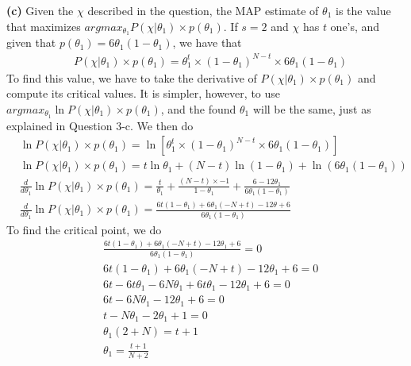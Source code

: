 \documentclass[leqno]{article}
\begin{document}
\noindent \textbf{(c)} Given the $\chi$ described in the question, the MAP estimate of $\theta_1$ is the value that maximizes 
 $argmax_{\theta_1} P(\chi|\theta_1) \times p(\theta_1)$. If $s = 2$ and $\chi$ has $t$ one's, and given that $p(\theta_1) = 6\theta_1(1 - \theta_1)$, 
we have that
\begin{equation*}
\begin{split}
&P(\chi|\theta_1) \times p(\theta_1) = \theta_1^t \times (1 - \theta_1)^{N - t} \times 6\theta_1(1 - \theta_1)
\end{split}  
\end{equation*} 
To find this value, we have to take the derivative of $P(\chi|\theta_1) \times p(\theta_1)$ and compute its critical values. It is simpler, however, 
to use $argmax_{\theta_1} \ln P(\chi|\theta_1) \times p(\theta_1)$, and the found $\theta_1$ will be the same, just as explained in Question 3-c. 
We then do
\begin{equation*}
\begin{split}
&\ln P(\chi|\theta_1) \times p(\theta_1) = \ln[\theta_1^t \times (1 - \theta_1)^{N - t} \times 6\theta_1(1 - \theta_1)]
\\
&\ln P(\chi|\theta_1) \times p(\theta_1) = t\ln \theta_1 + (N - t) \ln (1 - \theta_1) + \ln (6\theta_1(1 - \theta_1))
\\
&\frac{d}{d\theta_1}\ln P(\chi|\theta_1) \times p(\theta_1) = \frac{t}{\theta_1} + \frac{(N - t) \times -1}{1 - \theta_1} + \frac{6 - 12\theta_1}{6\theta_1(1 - \theta_1)}
\\
&\frac{d}{d\theta_1}\ln P(\chi|\theta_1) \times p(\theta_1) = \frac{6t(1 - \theta_1) + 6\theta_1(-N + t) - 12\theta + 6}{6\theta_1(1 - \theta_1)}
\end{split}  
\end{equation*} 
To find the critical point, we do
\begin{equation*}
\begin{split}
&\frac{6t(1 - \theta_1) + 6\theta_1(-N + t) - 12\theta_1 + 6}{6\theta_1(1 - \theta_1)} = 0
\\
& 6t(1 - \theta_1) + 6\theta_1(-N + t) - 12\theta_1 + 6 = 0
\\
& 6t - 6t\theta_1 - 6N\theta_1 + 6t\theta_1 -12\theta_1 + 6 = 0
\\
&6t - 6N\theta_1 -12\theta_1 + 6 = 0
\\
&t - N\theta_1 -2\theta_1 + 1 = 0
\\
&\theta_1(2 + N) = t + 1
\\
&\theta_1 = \frac{t + 1}{N + 2}
\end{split}  
\end{equation*} 
\end{document}
